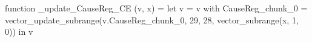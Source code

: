 function _update_CauseReg_CE (v, x) = let v = { v with CauseReg_chunk_0 = vector_update_subrange(v.CauseReg_chunk_0, 29, 28, vector_subrange(x, 1, 0)) } in v
